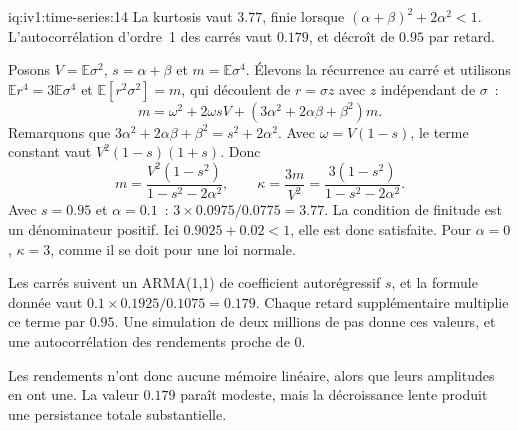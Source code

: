 \begin{solution}{iq:iv1:time-series:14}
La kurtosis vaut $3.77$, finie lorsque $(\alpha + \beta)^2 + 2\alpha^2 < 1$. L'autocorrélation d'ordre~1 des carrés vaut $0.179$, et décroît de $0.95$ par retard.

Posons $V = \mathbb{E}\sigma^2$, $s = \alpha + \beta$ et $m = \mathbb{E}\sigma^4$. Élevons la récurrence au carré et utilisons $\mathbb{E}r^4 = 3\mathbb{E}\sigma^4$ et $\mathbb{E}[r^2\sigma^2] = m$, qui découlent de $r = \sigma z$ avec $z$ indépendant de $\sigma$~:
\[
m = \omega^2 + 2\omega sV + (3\alpha^2 + 2\alpha\beta + \beta^2)m.
\]
Remarquons que $3\alpha^2 + 2\alpha\beta + \beta^2 = s^2 + 2\alpha^2$. Avec $\omega = V(1 - s)$, le terme constant vaut $V^2(1 - s)(1 + s)$. Donc
\[
m = \frac{V^2(1 - s^2)}{1 - s^2 - 2\alpha^2}, \qquad \kappa = \frac{3m}{V^2} = \frac{3(1 - s^2)}{1 - s^2 - 2\alpha^2}.
\]
Avec $s = 0.95$ et $\alpha = 0.1$~: $3 \times 0.0975/0.0775 = 3.77$. La condition de finitude est un dénominateur positif. Ici $0.9025 + 0.02 < 1$, elle est donc satisfaite. Pour $\alpha = 0$, $\kappa = 3$, comme il se doit pour une loi normale.

Les carrés suivent un ARMA(1,1) de coefficient autorégressif $s$, et la formule donnée vaut $0.1 \times 0.1925/0.1075 = 0.179$. Chaque retard supplémentaire multiplie ce terme par $0.95$. Une simulation de deux millions de pas donne ces valeurs, et une autocorrélation des rendements proche de 0.

Les rendements n'ont donc aucune mémoire linéaire, alors que leurs amplitudes en ont une. La valeur $0.179$ paraît modeste, mais la décroissance lente produit une persistance totale substantielle.



\end{solution}


